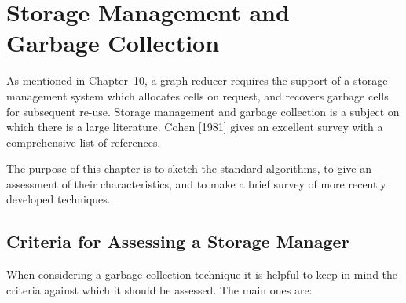 \chapter{Storage Management and\\ Garbage Collection}
\vspace{2cm}

As mentioned in Chapter~10, a graph reducer requires the support of a storage
management system which allocates cells on request, and recovers garbage
cells for subsequent re-use. Storage management and garbage collection is a
subject on which there is a large literature. Cohen [1981] gives an excellent
survey with a comprehensive list of references.

The purpose of this chapter is to sketch the standard algorithms, to give an
assessment of their characteristics, and to make a brief survey of more
recently developed techniques.

\section{Criteria for Assessing a Storage Manager}

When considering a garbage collection technique it is helpful to keep in mind
the criteria against which it should be assessed. The main ones are:

